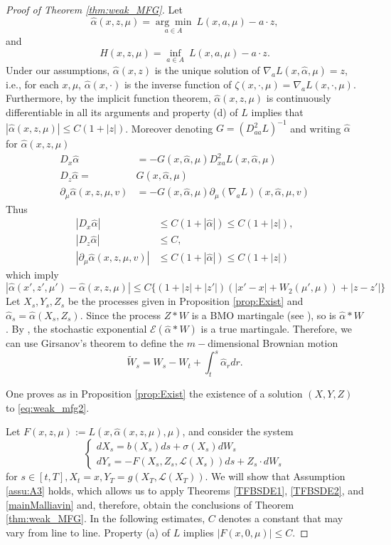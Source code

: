 \documentclass[12,english]{amsart}
\theoremstyle{plain}
\theoremstyle{definition}
\theoremstyle{plain}
\theoremstyle{plain}
\theoremstyle{remark}
\newcommand{\cE}{\mathcal E}
\newcommand{\cL}{\mathcal L}
\newcommand{\af}{\alpha}
\newcommand{\si}{\sigma}
\begin{document}
\begin{proof}[Proof of Theorem \ref{thm:weak_MFG}]
  Let
\[\hat{\af}(x,z,\mu)=\underset{a\in A}{\arg\min}\ L(x,a,\mu)-a\cdot z,\]
and
\[  H(x,z,\mu)=
  \inf\limits_{a\in A}\ L\left(x,a,\mu\right)-a\cdot z.\]
Under our assumptions, $\hat{\alpha}(x,z)$ is the unique solution of
$\nabla_{a}L(x,\hat{\af},\mu)=z$, i.e., for each $x,\mu$, $\hat{\af}(x,\cdot)$
is the inverse function of $\zeta(x,\cdot,\mu)=\nabla_{a}L(x,\cdot,\mu)$.
Furthermore, by the implicit function theorem, $\hat\af(x,z,\mu)$
is continuously differentiable in all its arguments and property (d) of $L$ implies that
$|\hat\af(x,z,\mu)|\le C(1+|z|)$. Moreover denoting
$G=(D_{aa}^2L)^{-1}$ and writing $\hat\af$ for $\hat{\alpha}(x,z,\mu)$
\begin{align*}
  D_x\hat\af &=-G(x,\hat\af,\mu) D_{xa}^2L(x,\hat\af,\mu)\\
D_z\hat\af=&G(x,\hat\af,\mu)\\
  \partial_\mu\hat{\af}(x,z,\mu,v) &=-G(x,\hat\af,\mu)\partial_\mu(\nabla_aL)(x,\hat\af,\mu,v) 
\end{align*}
Thus
\begin{align*}
  |D_x\hat\af| &\le C(1+|\hat\af|)\le C(1+|z|),\\
|D_z\hat\af|&\le C,\\
| \partial_\mu\hat{\af}(x,z,\mu,v)|&\le C(1+|\hat\af|)\le C(1+|z|)
\end{align*}
which imply
\[|\hat\af(x',z',\mu')-\hat\af(x,z,\mu)|\le C\{(1+|z|+|z'|)(|x'-x|+W_2(\mu',\mu))+|z-z'|\}\]
Let $X_s,Y_s,Z_s$ be the processes given in Proposition \ref{prop:Exist} and
$\hat{\alpha}_s=\hat{\alpha}\left(X_s,Z_s\right)$. Since
the process $Z\ast W$
is a BMO martingale (see \cite[Theorem 4.19]{carmona2018probabilistic}),
so is $\hat\af\ast W$. By \cite[Proposition 4.18]{carmona2018probabilistic},
the stochastic exponential $\cE(\hat\af\ast W)$ is a true martingale. Therefore, we can use Girsanov's theorem to
define the $m-$dimensional Brownian motion
\[
\tilde{W}_s=W_s-W_t+\int_t^s\hat{\alpha}_{r}dr.
\]

One proves as in Proposition \ref{prop:Exist} the existence of a
solution $(X,Y,Z)$  to \eqref{eq:weak_mfg2}. 

Let $F(x,z,\mu):=L(x,\hat{\alpha}(x,z,\mu),\mu)$, 
and consider the system
\begin{equation}\label{eq:weak_mfg2-b}
  \begin{cases}
    dX_s=b(X_s)ds+\si(X_s)dW_s \\
dY_s=-F(X_s,Z_s,\cL(X_s))ds+ Z_s\cdot   dW_s
\end{cases}
\end{equation}
for $s\in\left[t,T\right], X_t=x, Y_T=g(X_T,\cL(X_T)). $
We will show that Assumption \ref{assu:A3} holds, which allows us to apply Theorems \ref{TFBSDE1}, \ref{TFBSDE2}, and \ref{mainMalliavin} and, therefore, obtain the conclusions of Theorem \ref{thm:weak_MFG}. In the following estimates, $C$ denotes a constant that may vary from line to line. Property (a) of $L$ implies
$|F(x,0,\mu)|\le C$.


\end{proof}
\end{document}
